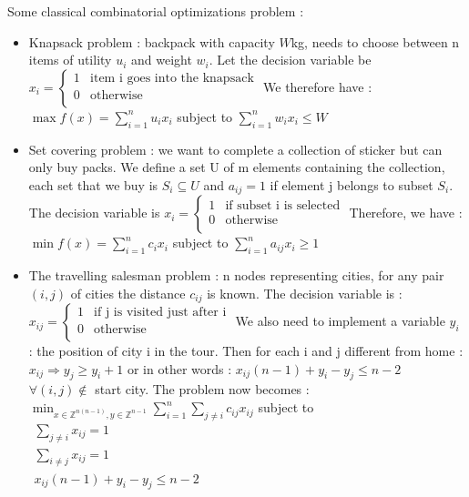 \documentclass[../main.tex]{subfiles}
\begin{document}
Some classical combinatorial optimizations problem : \begin{itemize}
    \item Knapsack problem : backpack with capacity $W$kg, needs to choose between n items of utility $u_i$ and weight $w_i$. Let the decision variable be $x_i = \begin{cases}
        1 & \text{item i goes into the knapsack}\\
        0 & \text{otherwise}\\
    \end{cases}$ We therefore have : $\max f(x) = \sum_{i=1}^n u_ix_i$ subject to $\sum_{i=1}^nw_ix_i \leq W$\\
    \item Set covering problem : we want to complete a collection of sticker but can only buy packs. We define a set U of m elements containing the collection, each set that we buy is $S_i \subseteq U$ and $a_{ij} = 1$ if element j belongs to subset $S_i$. The decision variable is $x_i = \begin{cases}
        1 & \text{if subset i is selected}\\
        0 & \text{otherwise}\\
    \end{cases}$
    Therefore, we have : $\min f(x) = \sum_{i=1}^n c_ix_i$ subject to $\sum_{i=1}^n a_{ij}x_i \geq 1$\\
    \item The travelling salesman problem : n nodes representing cities, for any pair $(i,j)$ of cities the distance $c_{ij}$ is known. The decision variable is : $x_{ij} = \begin{cases}
        1 & \text{if j is visited just after i}\\
        0 & \text{otherwise}\\
    \end{cases}$
    We also need to implement a variable $y_i$ : the position of city i in the tour. Then for each i and j different from home : $x_{ij} \Rightarrow y_j \geq y_i+1$ or in other words : $x_{ij}(n-1) + y_i-y_j \leq n-2$ $\forall (i,j) \notin$ start city. The problem now becomes : \\
    $\min_{x\in \mathbb{Z}^{n(n-1)}, y \in \mathbb{Z}^{n-1}} \sum_{i=1}^n \sum_{j\neq i} c_{ij}x_{ij}$ subject to $\begin{matrix}
        \sum_{j\neq i} x_{ij} = 1\\
        \sum_{i \neq j} x_{ij} = 1\\
        x_{ij}(n-1) + y_i - y_j \leq n-2\\
    \end{matrix}$\\
\end{itemize}
\end{document}
